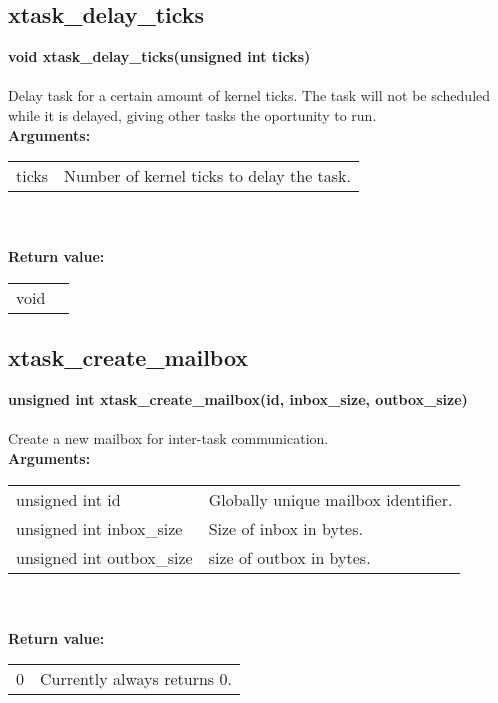 \begin{samepage}
\subsection{xtask\_delay\_ticks}
\noindent
\textbf{void xtask\_delay\_ticks(unsigned int ticks)}\\\\
Delay task for a certain amount of kernel ticks. The task will not be scheduled
while it is delayed, giving other tasks the oportunity to run.\\

\noindent
\textbf{Arguments:}\\
\indent\begin{tabular}{ p{4.5cm}  p{9cm} }
ticks & Number of kernel ticks to delay the task.
\end{tabular}\\\\

\noindent
\textbf{Return value:}\\
\indent\begin{tabular}{  p{4.5cm}  p{9cm} }
void \\
\end{tabular}
\end{samepage}

\begin{samepage}
\subsection{xtask\_create\_mailbox}
\noindent
\textbf{unsigned int xtask\_create\_mailbox(id, inbox\_size, outbox\_size)}\\\\
Create a new mailbox for inter-task communication.\\

\noindent
\textbf{Arguments:}\\
\indent\begin{tabular}{ p{4.5cm}  p{9cm} }
unsigned int id          & Globally unique mailbox identifier.\\
unsigned int inbox\_size  & Size of inbox in bytes.            \\
unsigned int outbox\_size & size of outbox in bytes.           
\end{tabular}\\\\

\noindent
\textbf{Return value:}\\
\indent\begin{tabular}{  p{4.5cm}  p{9cm} }
0 & Currently always returns 0. \\
\end{tabular}
\end{samepage}


